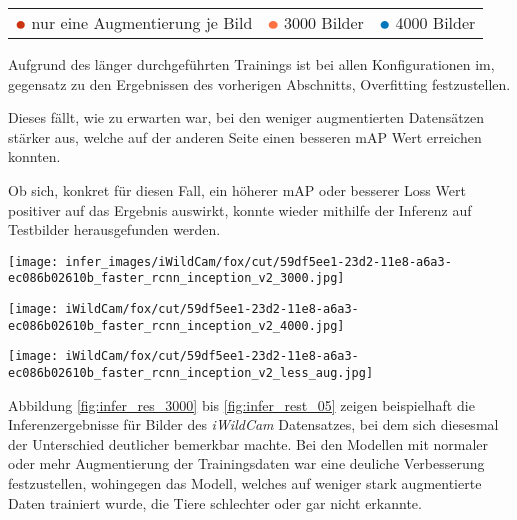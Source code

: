 \begin{table}[htb]
  \centering
  \begin{tabular}{ m{}<{\centering}
                   m{}<{\centering}
                   m{}<{\centering}}
      $\color[HTML]{CC3311}\medbullet$ nur eine Augmentierung je Bild &
      $\color[HTML]{FF7043}\medbullet$  3000 Bilder &
      $\color[HTML]{0077BB}\medbullet$  4000 Bilder
  \end{tabular}    
\end{table}
\vspace{1cm}

Aufgrund des länger durchgeführten Trainings
ist bei allen Konfigurationen im, gegensatz zu den
Ergebnissen des vorherigen Abschnitts, Overfitting 
festzustellen.

Dieses fällt, wie zu erwarten war, bei den weniger  
augmentierten Datensätzen stärker aus, welche auf der 
anderen Seite einen besseren mAP Wert erreichen konnten.

Ob sich, konkret für diesen Fall, ein höherer mAP oder 
besserer Loss Wert positiver auf das Ergebnis auswirkt,
konnte wieder mithilfe der Inferenz auf Testbilder 
herausgefunden werden.
\vspace{1cm}

\begin{minipage}{0.333\textwidth}
  \centering
  \texttt{[image: infer\_images/iWildCam/fox/cut/59df5ee1-23d2-11e8-a6a3-ec086b02610b\_faster\_rcnn\_inception\_v2\_3000.jpg]}
  \label{fig:infer_res_3000}
\end{minipage}
\begin{minipage}{0.333\textwidth}
  \centering
  \label{fig:infer_res_4000}
  \texttt{[image: iWildCam/fox/cut/59df5ee1-23d2-11e8-a6a3-ec086b02610b\_faster\_rcnn\_inception\_v2\_4000.jpg]}
\end{minipage}
\begin{minipage}{0.333\textwidth}
  \centering
  \texttt{[image: iWildCam/fox/cut/59df5ee1-23d2-11e8-a6a3-ec086b02610b\_faster\_rcnn\_inception\_v2\_less\_aug.jpg]}
  \label{fig:infer_rest_05}
\end{minipage}
\vspace{1cm}

Abbildung \ref{fig:infer_res_3000} bis \ref{fig:infer_rest_05}
zeigen beispielhaft die Inferenzergebnisse für Bilder des 
\textit{iWildCam} Datensatzes, bei dem sich diesesmal der 
Unterschied deutlicher bemerkbar machte.
Bei den Modellen mit normaler oder mehr Augmentierung der 
Trainingsdaten war eine deuliche Verbesserung festzustellen, 
wohingegen das Modell, welches auf weniger stark augmentierte 
Daten trainiert wurde, die Tiere schlechter oder gar nicht erkannte.



